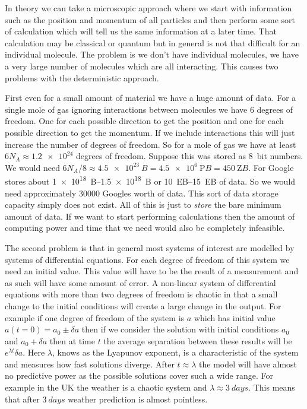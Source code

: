 \documentclass[a4paper]{article}
\begin{document}
    In theory we can take a microscopic approach where we start with information such as the position and momentum of all particles and then perform some sort of calculation which will tell us the same information at a later time.
    That calculation may be classical or quantum but in general is not that difficult for an individual molecule.
    The problem is we don't have individual molecules, we have a very large number of molecules which are all interacting.
    This causes two problems with the deterministic approach.
    
    First even for a small amount of material we have a huge amount of data.
    For a single mole of gas ignoring interactions between molecules we have 6 degrees of freedom.
    One for each possible direction to get the position and one for each possible direction to get the momentum.
    If we include interactions this will just increase the number of degrees of freedom.
    So for a mole of gas we have at least \(6N_A \approx \num{1.2e24}\) degrees of freedom.
    Suppose this was stored as \SI{8}{bit} numbers.
    We would need \(6N_A/8 \approx \SI{4.5e23}{B} = \SI{4.5e6}{\peta B} = \SI{450}{\zetta B}\).
    For Google stores about \SIrange{1e18}{1.5e18}{B} or \SIrange{10}{15}{\exa B} of data.
    So we would need approximately \(30000\) Googles worth of data.
    This sort of data storage capacity simply does not exist.
    All of this is just to \emph{store} the bare minimum amount of data.
    If we want to start performing calculations then the amount of computing power and time that we need would also be completely infeasible.
    
    The second problem is that in general most systems of interest are modelled by systems of differential equations.
    For each degree of freedom of this system we need an initial value.
    This value will have to be the result of a measurement and as such will have some amount of error.
    A non-linear system of differential equations with more than two degrees of freedom is chaotic in that a small change to the initial conditions will create a large change in the output.
    For example if one degree of freedom of the system is \(a\) which has initial value \(a(t = 0) = a_0 \pm \delta a\) then if we consider the solution with initial conditions \(a_0\) and \(a_0 + \delta a\) then at time \(t\) the average separation between these results will be \(e^{\lambda t}\delta a\).
    Here \(\lambda\), knows as the Lyapunov exponent, is a characteristic of the system and measures how fast solutions diverge.
    After \(t \approx \lambda\) the model will have almost no predictive power as the possible solutions cover such a wide range.
    For example in the UK the weather is a chaotic system and \(\lambda \approx \SI{3}{days}\).
    This means that after \(\SI{3}{days}\) weather prediction is almost pointless.
    
\end{document}
